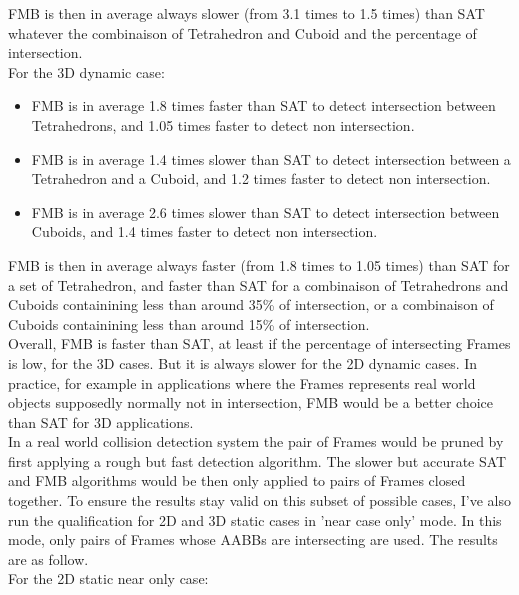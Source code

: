 \documentclass[12pt, a4paper]{article}
\begin{document}
FMB is then in average always slower (from 3.1 times to 1.5 times) than SAT whatever the combinaison of Tetrahedron and Cuboid and the percentage of intersection.\\ 

For the 3D dynamic case:\\

\begin{itemize}
\item FMB is in average 1.8 times faster than SAT to detect intersection between Tetrahedrons, and 1.05 times faster to detect non intersection.\\
\item FMB is in average 1.4 times slower than SAT to detect intersection between a Tetrahedron and a Cuboid, and 1.2 times faster to detect non intersection.\\
\item FMB is in average 2.6 times slower than SAT to detect intersection between Cuboids, and 1.4 times faster to detect non intersection.\\
\end{itemize}

FMB is then in average always faster (from 1.8 times to 1.05 times) than SAT for a set of Tetrahedron, and faster than SAT for a combinaison of Tetrahedrons and Cuboids containining less than around 35\% of intersection, or a combinaison of Cuboids containining less than around 15\% of intersection.\\ 

Overall, FMB is faster than SAT, at least if the percentage of intersecting Frames is low, for the 3D cases. But it is always slower for the 2D dynamic cases. In practice, for example in applications where the Frames represents real world objects supposedly normally not in intersection, FMB would be a better choice than SAT for 3D applications.\\

In a real world collision detection system the pair of Frames would be pruned by first applying a rough but fast detection algorithm. The slower but accurate SAT and FMB algorithms would be then only applied to pairs of Frames closed together. To ensure the results stay valid on this subset of possible cases, I've also run the qualification for 2D and 3D static cases in 'near case only' mode. In this mode, only pairs of Frames whose AABBs are intersecting are used. The results are as follow.\\

For the 2D static near only case:\\
\end{document}
